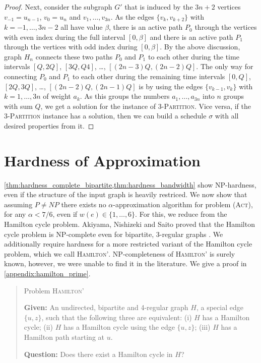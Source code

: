 \documentclass[runningheads]{llncs}
\numberwithin{equation}{section}
\newcommand{\set}[1]{\{ #1 \}}
\newcommand{\act}{\textsc{(Act)}}
\begin{document}
\begin{proof}
Next, consider the subgraph $G'$ that is induced by the $3n+2$ vertices $v_{-1}=u_{n-1}$, $v_0=u_n$ and 
$v_1,\ldots,v_{3n}$.
As the edges $\{v_k, v_{k+2}\}$ with $k=-1,\ldots,3n-2$ all have value $\beta$, there is an active path $P_0$ 
through the vertices with even index during the full interval $[0,\beta]$ and there is an active 
path $P_1$ through the vertices with odd index during $[0, \beta]$.
By the above discussion, graph $H_n$ connects these two paths $P_0$ and $P_1$ to each other during the
time intervals $[Q,2Q]$, $[3Q,Q4]$, \dots, $[(2n-3)Q,(2n-2)Q]$.
The only way for connecting $P_0$ and $P_1$ to each other during the remaining time intervals 
$[0,Q]$, $[2Q,3Q]$, \dots, $[(2n-2)Q,(2n-1)Q]$ is by using the edges $\{v_{k-1},v_k\}$ with $k=1,\ldots,3n$ of 
weight $a_k$.
As this groups the numbers $a_1,\ldots,a_{3n}$ into $n$ groups with sum $Q$, we get a solution
for the instance of \textsc{3-Partition}.
Vice versa, if the \textsc{3-Partition} instance has a solution, then we can build a schedule $\sigma$
with all desired properties from it.
\end{proof}

\section{Hardness of Approximation}
\label{sec:inapprox}

\cref{thm:hardness_complete_bipartite,thm:hardness_bandwidth} show NP-hardness, even if the structure of the input graph is heavily restriced. 
We now show that assuming $P \neq NP$ there exists no $\alpha$-approximation algorithm for problem {\act}, for 
any $\alpha < 7/6$, even if $w(e) \in \{1,\dots,6\}$.
For this, we reduce from the Hamilton cycle problem. Akiyama, Nishizeki and Saito proved that the Hamilton cycle problem is NP-complete even for bipartite, 3-regular graphs \cite{hamilton3regularBip}. We additionally require hardness for a more restricted variant of the Hamilton cycle problem, which we call \textsc{Hamilton'}. NP-completeness of \textsc{Hamilton'} is surely known, however, we were unable to find it in the literature. We give a proof in \cref{appendix:hamilton_prime}.

\begin{quote}

Problem \textsc{Hamilton'} 

\textbf{Given:} An undirected, bipartite and 4-regular graph $H$, a special edge $\set{u, z}$, such that the following three are equivalent: (i) $H$ has a Hamilton cycle; (ii) $H$ has a Hamilton cycle using the edge $\set{u, z}$; (iii) $H$ has a Hamilton path starting at $u$.

\textbf{Question:} Does there exist a Hamilton cycle in $H$?

\end{quote}
\end{document}
